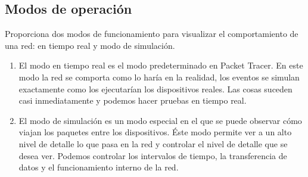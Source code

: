 \documentclass{article}
\begin{document}
\subsection{Modos de operación}
Proporciona dos modos de funcionamiento para visualizar el comportamiento de una red: en tiempo real y modo de simulación.
\begin{enumerate}
         \item El modo en tiempo real es el modo predeterminado en Packet Tracer. En este modo la red se comporta como lo haría en la realidad, los eventos se simulan exactamente como los ejecutarían los dispositivos reales. Las cosas suceden casi inmediatamente y podemos hacer pruebas en tiempo real.
         \item El modo de simulación es un modo especial en el que se puede observar cómo viajan los paquetes entre los dispositivos. Éste modo permite ver a un alto nivel de detalle lo que pasa en la red y controlar el nivel de detalle que se desea ver. Podemos controlar los intervalos de tiempo, la transferencia de datos y el funcionamiento interno de la red. 
     \end{enumerate}
\end{document}
